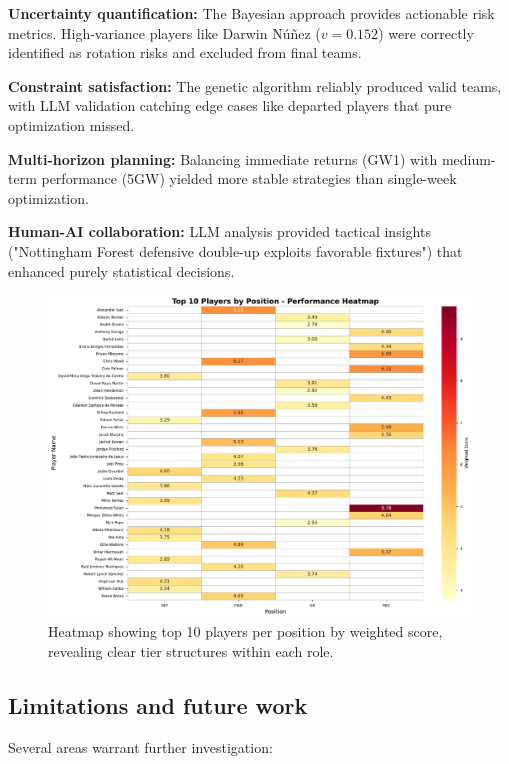 \documentclass[10pt,a4paper,twocolumn]{article}
\begin{document}
\textbf{Uncertainty quantification:} The Bayesian approach provides actionable risk metrics. High-variance players like Darwin Núñez ($v = 0.152$) were correctly identified as rotation risks and excluded from final teams.

\textbf{Constraint satisfaction:} The genetic algorithm reliably produced valid teams, with LLM validation catching edge cases like departed players that pure optimization missed.

\textbf{Multi-horizon planning:} Balancing immediate returns (GW1) with medium-term performance (5GW) yielded more stable strategies than single-week optimization.

\textbf{Human-AI collaboration:} LLM analysis provided tactical insights ("Nottingham Forest defensive double-up exploits favorable fixtures") that enhanced purely statistical decisions.

\begin{figure}[h]
\centering
\includegraphics[width=\columnwidth]{figures/top_players_heatmap.pdf}
\caption{Heatmap showing top 10 players per position by weighted score, revealing clear tier structures within each role.}
\label{fig:heatmap}
\end{figure}

\subsection*{Limitations and future work}

Several areas warrant further investigation:
\end{document}
